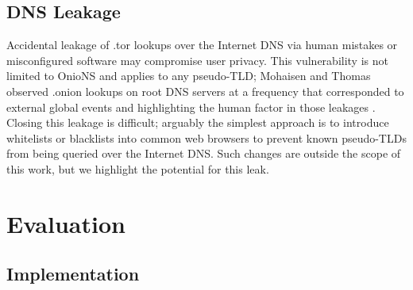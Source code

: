 \documentclass[USenglish,oneside,twocolumn]{article}
\begin{document}
\subsection{DNS Leakage} %

Accidental leakage of .tor lookups over the Internet DNS via human mistakes or misconfigured software may compromise user privacy. This vulnerability is not limited to OnioNS and applies to any pseudo-TLD; Mohaisen and Thomas observed .onion lookups on root DNS servers at a frequency that corresponded to external global events and highlighting the human factor in those leakages \cite{thomasmeasuring}. Closing this leakage is difficult; arguably the simplest approach is to introduce whitelists or blacklists into common web browsers to prevent known pseudo-TLDs from being queried over the Internet DNS. Such changes are outside the scope of this work, but we highlight the potential for this leak.





\section{Evaluation}
\label{sec:Evaluation}

\subsection{Implementation} %
\end{document}

